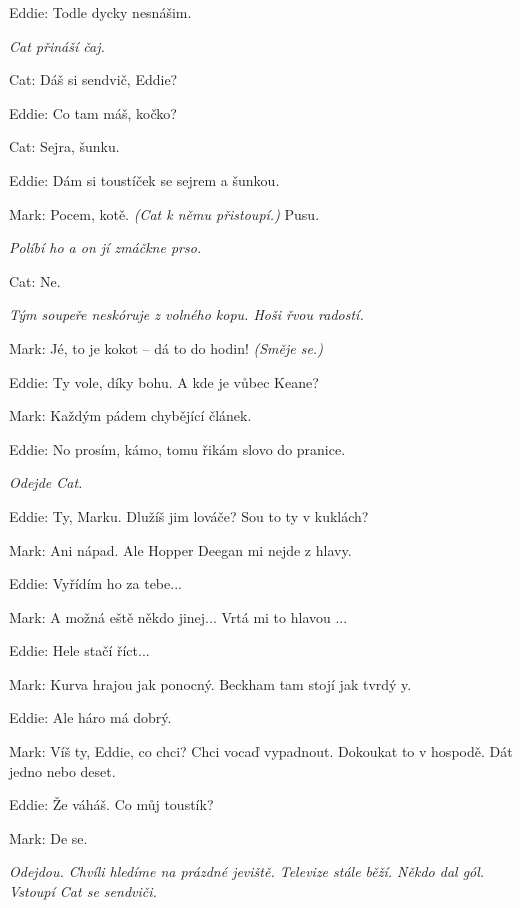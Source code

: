 \medskip
\noindent
Eddie: Todle dycky nesnášim.

\medskip
\noindent
\textit{Cat přináší čaj.}

\medskip
\noindent
Cat: Dáš si sendvič, Eddie?

\medskip
\noindent
Eddie: Co tam máš, kočko?

\medskip
\noindent
Cat: Sejra, šunku.

\medskip
\noindent
Eddie: Dám si toustíček se sejrem a šunkou.

\medskip
\noindent
Mark: Pocem, kotě. \textit{(Cat k němu přistoupí.)} Pusu.

\medskip
\noindent
\textit{Políbí ho a on jí zmáčkne prso.}

\medskip
\noindent
Cat: Ne.

\medskip
\noindent
\textit{Tým soupeře neskóruje z volného kopu. Hoši řvou radostí.}

\medskip
\noindent
Mark: Jé, to je kokot -- dá to do hodin! \textit{(Směje se.)}

\medskip
\noindent
Eddie: Ty vole, díky bohu. A kde je vůbec Keane?

\medskip
\noindent
Mark: Každým pádem chybějící článek.

\medskip
\noindent
Eddie: No prosím, kámo, tomu řikám slovo do pranice. 

\medskip
\noindent
\textit{Odejde Cat.} 

\medskip
\noindent
Eddie: Ty, Marku. Dlužíš jim lováče? Sou to ty v kuklách?

\medskip
\noindent
Mark: Ani nápad. Ale Hopper Deegan mi nejde z hlavy.

\medskip
\noindent
Eddie: Vyřídím ho za tebe...

\medskip
\noindent
Mark: A možná eště někdo jinej... Vrtá mi to hlavou ...

\medskip
\noindent
Eddie: Hele stačí říct...

\medskip
\noindent
Mark: Kurva hrajou jak ponocný. Beckham tam stojí jak tvrdý y.

\medskip
\noindent
Eddie: Ale háro má dobrý.

\medskip
\noindent
Mark: Víš ty, Eddie, co chci? Chci vocaď vypadnout. Dokoukat to v hospodě. Dát jedno nebo deset. 

\medskip
\noindent
Eddie:	Že váháš. Co můj toustík?

\medskip
\noindent
Mark: De se.

\medskip
\noindent
\textit{Odejdou. Chvíli hledíme na prázdné jeviště. Televize stále běží. Někdo dal gól. Vstoupí Cat se sendviči.}

